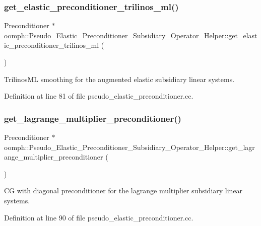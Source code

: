\subsubsection{\texorpdfstring{get\+\_\+elastic\+\_\+preconditioner\+\_\+trilinos\+\_\+ml()}{get\_elastic\_preconditioner\_trilinos\_ml()}}
{\footnotesize\ttfamily Preconditioner $\ast$ oomph\+::\+Pseudo\+\_\+\+Elastic\+\_\+\+Preconditioner\+\_\+\+Subsidiary\+\_\+\+Operator\+\_\+\+Helper\+::get\+\_\+elastic\+\_\+preconditioner\+\_\+trilinos\+\_\+ml (\begin{DoxyParamCaption}{ }\end{DoxyParamCaption})}



Trilinos\+ML smoothing for the augmented elastic subsidiary linear systems. 



Definition at line 81 of file pseudo\+\_\+elastic\+\_\+preconditioner.\+cc.

\mbox{\label{namespaceoomph_1_1Pseudo__Elastic__Preconditioner__Subsidiary__Operator__Helper_a00a15f5ea18cab0665797ba03a9c9286}} 
\subsubsection{\texorpdfstring{get\+\_\+lagrange\+\_\+multiplier\+\_\+preconditioner()}{get\_lagrange\_multiplier\_preconditioner()}}
{\footnotesize\ttfamily Preconditioner $\ast$ oomph\+::\+Pseudo\+\_\+\+Elastic\+\_\+\+Preconditioner\+\_\+\+Subsidiary\+\_\+\+Operator\+\_\+\+Helper\+::get\+\_\+lagrange\+\_\+multiplier\+\_\+preconditioner (\begin{DoxyParamCaption}{ }\end{DoxyParamCaption})}



CG with diagonal preconditioner for the lagrange multiplier subsidiary linear systems. 



Definition at line 90 of file pseudo\+\_\+elastic\+\_\+preconditioner.\+cc.

